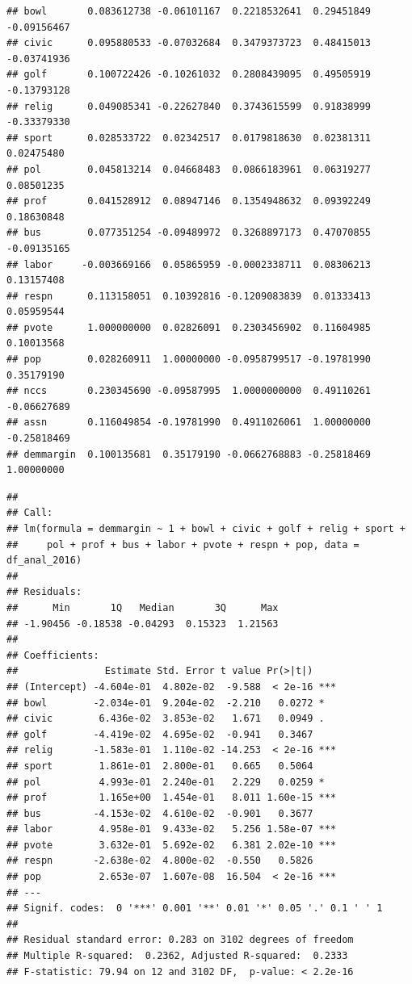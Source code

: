 \documentclass[
  english,
  man]{apa6}
\begin{document}
\begin{verbatim}
## bowl       0.083612738 -0.06101167  0.2218532641  0.29451849 -0.09156467
## civic      0.095880533 -0.07032684  0.3479373723  0.48415013 -0.03741936
## golf       0.100722426 -0.10261032  0.2808439095  0.49505919 -0.13793128
## relig      0.049085341 -0.22627840  0.3743615599  0.91838999 -0.33379330
## sport      0.028533722  0.02342517  0.0179818630  0.02381311  0.02475480
## pol        0.045813214  0.04668483  0.0866183961  0.06319277  0.08501235
## prof       0.041528912  0.08947146  0.1354948632  0.09392249  0.18630848
## bus        0.077351254 -0.09489972  0.3268897173  0.47070855 -0.09135165
## labor     -0.003669166  0.05865959 -0.0002338711  0.08306213  0.13157408
## respn      0.113158051  0.10392816 -0.1209083839  0.01333413  0.05959544
## pvote      1.000000000  0.02826091  0.2303456902  0.11604985  0.10013568
## pop        0.028260911  1.00000000 -0.0958799517 -0.19781990  0.35179190
## nccs       0.230345690 -0.09587995  1.0000000000  0.49110261 -0.06627689
## assn       0.116049854 -0.19781990  0.4911026061  1.00000000 -0.25818469
## demmargin  0.100135681  0.35179190 -0.0662768883 -0.25818469  1.00000000
\end{verbatim}

\begin{verbatim}
## 
## Call:
## lm(formula = demmargin ~ 1 + bowl + civic + golf + relig + sport + 
##     pol + prof + bus + labor + pvote + respn + pop, data = df_anal_2016)
## 
## Residuals:
##      Min       1Q   Median       3Q      Max 
## -1.90456 -0.18538 -0.04293  0.15323  1.21563 
## 
## Coefficients:
##               Estimate Std. Error t value Pr(>|t|)    
## (Intercept) -4.604e-01  4.802e-02  -9.588  < 2e-16 ***
## bowl        -2.034e-01  9.204e-02  -2.210   0.0272 *  
## civic        6.436e-02  3.853e-02   1.671   0.0949 .  
## golf        -4.419e-02  4.695e-02  -0.941   0.3467    
## relig       -1.583e-01  1.110e-02 -14.253  < 2e-16 ***
## sport        1.861e-01  2.800e-01   0.665   0.5064    
## pol          4.993e-01  2.240e-01   2.229   0.0259 *  
## prof         1.165e+00  1.454e-01   8.011 1.60e-15 ***
## bus         -4.153e-02  4.610e-02  -0.901   0.3677    
## labor        4.958e-01  9.433e-02   5.256 1.58e-07 ***
## pvote        3.632e-01  5.692e-02   6.381 2.02e-10 ***
## respn       -2.638e-02  4.800e-02  -0.550   0.5826    
## pop          2.653e-07  1.607e-08  16.504  < 2e-16 ***
## ---
## Signif. codes:  0 '***' 0.001 '**' 0.01 '*' 0.05 '.' 0.1 ' ' 1
## 
## Residual standard error: 0.283 on 3102 degrees of freedom
## Multiple R-squared:  0.2362, Adjusted R-squared:  0.2333 
## F-statistic: 79.94 on 12 and 3102 DF,  p-value: < 2.2e-16
\end{verbatim}
\end{document}
